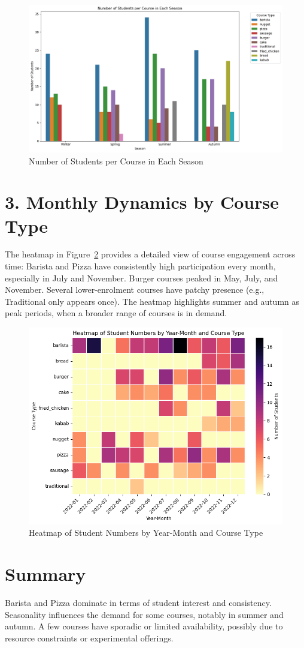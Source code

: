 \documentclass[12pt,a4paper]{article}
\begin{document}
\begin{figure}[h!]
    \centering
    \includegraphics[width=1\textwidth]{Number of Students per Course in Each Season.png}
    \caption{Number of Students per Course in Each Season}
    \label{fig:seasonal-courses}
\end{figure}

\section*{3. Monthly Dynamics by Course Type}
The heatmap in Figure~\ref{fig:heatmap-course-month} provides a detailed view of course engagement across time:  
Barista and Pizza have consistently high participation every month, especially in July and November.  
Burger courses peaked in May, July, and November.  
Several lower-enrolment courses have patchy presence (e.g., Traditional only appears once).  
The heatmap highlights summer and autumn as peak periods, when a broader range of courses is in demand.

\begin{figure}[h!]
    \centering
    \includegraphics[width=1\textwidth]{Heatmap of Student Numbers by Year-Month and Course Type.png}
    \caption{Heatmap of Student Numbers by Year-Month and Course Type}
    \label{fig:heatmap-course-month}
\end{figure}

\section*{Summary}
Barista and Pizza dominate in terms of student interest and consistency.  
Seasonality influences the demand for some courses, notably in summer and autumn.  
A few courses have sporadic or limited availability, possibly due to resource constraints or experimental offerings.
\end{document}

